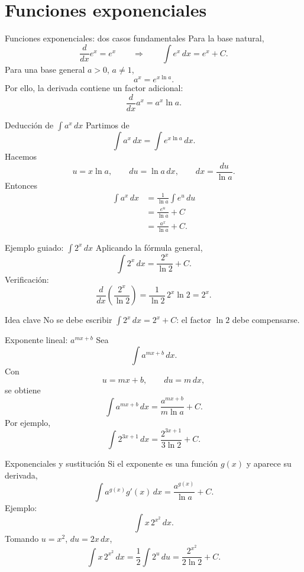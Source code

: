 \documentclass[10pt,aspectratio=169]{beamer}
\begin{document}
\section{Funciones exponenciales}

\begin{frame}{Funciones exponenciales: dos casos fundamentales}
\small
Para la base natural,
\[
\frac{d}{dx}e^x=e^x
\qquad\Longrightarrow\qquad
\boxed{\int e^x\,dx=e^x+C}.
\]
\pause
Para una base general $a>0$, $a\neq1$,
\[
a^x=e^{x\ln a}.
\]
Por ello, la derivada contiene un factor adicional:
\[
\boxed{\frac{d}{dx}a^x=a^x\ln a}.
\]
\end{frame}

\begin{frame}{Deducción de $\int a^x\,dx$}
\small
Partimos de
\[
\int a^x\,dx=\int e^{x\ln a}\,dx.
\]
Hacemos
\[
u=x\ln a,
\qquad du=\ln a\,dx,
\qquad dx=\frac{du}{\ln a}.
\]
Entonces
\[
\begin{aligned}
\int a^x\,dx
&=\frac{1}{\ln a}\int e^u\,du\\
&=\frac{e^u}{\ln a}+C\\
&=\boxed{\frac{a^x}{\ln a}+C}.
\end{aligned}
\]
\end{frame}

\begin{frame}{Ejemplo guiado: $\int 2^x\,dx$}
\small
Aplicando la fórmula general,
\[
\boxed{\int 2^x\,dx=\frac{2^x}{\ln2}+C}.
\]
\pause
Verificación:
\[
\frac{d}{dx}\left(\frac{2^x}{\ln2}\right)
=\frac{1}{\ln2}\,2^x\ln2
=2^x.
\]
\pause
\begin{block}{Idea clave}
No se debe escribir $\int 2^x\,dx=2^x+C$: el factor $\ln2$ debe compensarse.
\end{block}
\end{frame}

\begin{frame}{Exponente lineal: $a^{mx+b}$}
\small
Sea
\[
\int a^{mx+b}\,dx.
\]
Con
\[
u=mx+b,\qquad du=m\,dx,
\]
se obtiene
\[
\boxed{\int a^{mx+b}\,dx
=\frac{a^{mx+b}}{m\ln a}+C}.
\]
\pause
Por ejemplo,
\[
\int2^{3x+1}\,dx
=\boxed{\frac{2^{3x+1}}{3\ln2}+C}.
\]
\end{frame}

\begin{frame}{Exponenciales y sustitución}
\small
Si el exponente es una función $g(x)$ y aparece su derivada,
\[
\boxed{\int a^{g(x)}g'(x)\,dx
=\frac{a^{g(x)}}{\ln a}+C}.
\]
\pause
Ejemplo:
\[
\int x\,2^{x^2}\,dx.
\]
Tomando $u=x^2$, $du=2x\,dx$,
\[
\int x\,2^{x^2}\,dx
=\frac12\int2^u\,du
=\boxed{\frac{2^{x^2}}{2\ln2}+C}.
\]
\end{frame}
\end{document}
